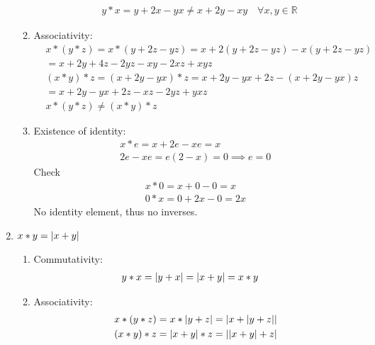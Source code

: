 \documentclass[nohyper,nobib]{tufte-handout}
\theoremstyle{definition}
\theoremstyle{remark}
\begin{document}
\begin{enumerate}
\begin{enumerate}[I]
                \begin{align}
                    & y * x = y + 2x - yx \neq x + 2y -xy \quad\forall x,y \in \mathbb{R}
                \end{align}
            \item Associativity:
                \begin{align}
                    &x * (y * z) = x * (y + 2z - yz) = x + 2(y + 2z - yz) - x(y + 2z - yz) \nonumber \\
                    &= x + 2y + 4z -2yz - xy - 2xz + xyz \nonumber \\
                    &(x * y) * z = (x + 2y - yx) * z = x + 2y - yx + 2z - (x + 2y -yx)z \nonumber \\
                                &= x + 2y - yx + 2z - xz - 2yz + yxz \nonumber \\
                                &x * (y * z) \neq (x * y) * z
                \end{align}
            \item Existence of identity:
                \begin{align}
                    x * e =  x + 2e - xe = x \nonumber \\
                    2e - xe = e(2 - x) = 0 \implies e = 0
                \end{align}
                Check
                \begin{align}
                    x * 0 = x + 0 - 0 =  x \nonumber \\
                    0 * x = 0 + 2x - 0  = 2x
                \end{align}
                No identity element, thus no inverses.
        \end{enumerate}
    \item $x * y = \abs{x + y}$
        \begin{enumerate}[I]
            \item Commutativity:
                \begin{align}
                    &y * x = \abs{y + x} = \abs{x + y} = x * y
                \end{align}
            \item Associativity:
                \begin{align}
                    &x * (y * z) = x * \abs{y + z} = \abs{x + \abs{y + z}} \nonumber \\
                    &(x * y) * z = \abs{x + y} * z = \abs{\abs{x + y} + z} 
                \end{align}

\end{enumerate}
\end{enumerate}
\end{document}
